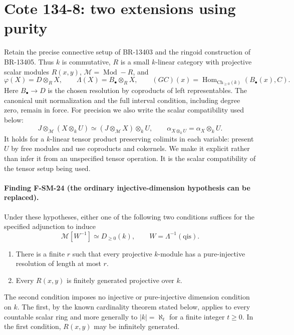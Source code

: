 \section{Cote 134-8: two extensions using purity}
\label{sec:SM-cote1348-purity}

Retain the precise connective setup of BR-13403 and the ringoid
construction of BR-13405. Thus $k$ is commutative,
$R$ is a small $k$-linear category with projective scalar modules
$R(x,y)$, $\mathcal M=\operatorname{Mod}\!-\!R$, and
\[
 \varphi(X)=D\otimes_R X,\qquad
 \Lambda(X)=B_\bullet\otimes_R X,\qquad
 (GC)(x)=\operatorname{Hom}_{\mathrm{Ch}_{\geq0}(k)}(B_\bullet(x),C).
 \tag{SM24.1}
\]
Here $B_\bullet\to D$ is the chosen resolution by coproducts of
left representables. The canonical unit normalization and the full
interval condition, including degree zero, remain in force.
For precision we also write the scalar compatibility used below:
\[
 J\otimes_{\mathcal M}(X\otimes_k U)
   \simeq (J\otimes_{\mathcal M}X)\otimes_k U,\qquad
 \alpha_{X\otimes_k U}=\alpha_X\otimes_k U.
 \tag{SM24.2}
\]
It holds for a $k$-linear tensor product preserving colimits in each
variable: present $U$ by free modules and use coproducts and cokernels.
We make it explicit rather than infer it from an unspecified tensor
operation. It is the scalar compatibility of the tensor setup being
used.

\paragraph{Finding F-SM-24 (the ordinary injective-dimension hypothesis can be replaced).}
Under these hypotheses, either one of the following two conditions
suffices for the specified adjunction to induce
\[
 \mathcal M[W^{-1}]\simeq D_{\geq0}(k),
 \qquad W=\Lambda^{-1}(\mathrm{qis}).
 \tag{SM24.3}
\]
\begin{enumerate}
\item There is a finite $r$ such that every projective $k$-module
      has a pure-injective resolution of length at most $r$.
\item Every $R(x,y)$ is finitely generated projective over $k$.
\end{enumerate}
The second condition imposes no injective or pure-injective dimension
condition on $k$. The first, by the known cardinality theorem stated
below, applies to every countable scalar ring and more generally to
$|k|=\aleph_t$ for a finite integer $t\geq0$.
In the first condition, $R(x,y)$ may be infinitely generated.

